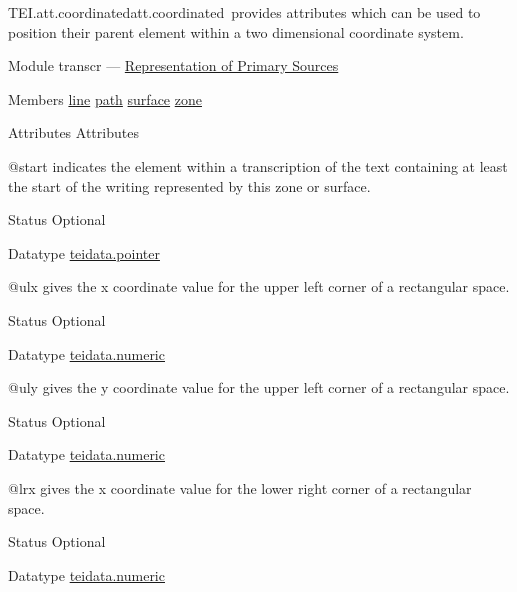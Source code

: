 \begin{reflist}
\item[]\begin{specHead}{TEI.att.coordinated}{att.coordinated} provides attributes which can be used to position their parent element within a two dimensional coordinate system.\end{specHead} 
    \item[{Module}]
  transcr — \hyperref[PH]{Representation of Primary Sources}
    \item[{Members}]
  \hyperref[TEI.line]{line} \hyperref[TEI.path]{path} \hyperref[TEI.surface]{surface} \hyperref[TEI.zone]{zone}
    \item[{Attributes}]
  Attributes\hfil\\[-10pt]\begin{sansreflist}
    \item[@start]
  indicates the element within a transcription of the text containing at least the start of the writing represented by this zone or surface.
\begin{reflist}
    \item[{Status}]
  Optional
    \item[{Datatype}]
  \hyperref[TEI.teidata.pointer]{teidata.pointer}
\end{reflist}  
    \item[@ulx]
  gives the x coordinate value for the upper left corner of a rectangular space.
\begin{reflist}
    \item[{Status}]
  Optional
    \item[{Datatype}]
  \hyperref[TEI.teidata.numeric]{teidata.numeric}
\end{reflist}  
    \item[@uly]
  gives the y coordinate value for the upper left corner of a rectangular space.
\begin{reflist}
    \item[{Status}]
  Optional
    \item[{Datatype}]
  \hyperref[TEI.teidata.numeric]{teidata.numeric}
\end{reflist}  
    \item[@lrx]
  gives the x coordinate value for the lower right corner of a rectangular space.
\begin{reflist}
    \item[{Status}]
  Optional
    \item[{Datatype}]
  \hyperref[TEI.teidata.numeric]{teidata.numeric}
\end{reflist}  

\end{sansreflist}
\end{reflist}
